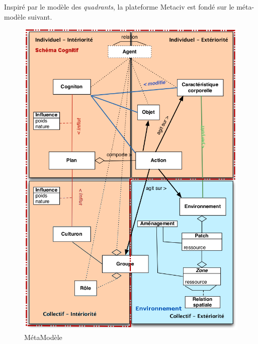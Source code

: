 \documentclass[a4paper,oneside,12 pt]{article}
\begin{document}
Inspiré par le modèle des \textit{quadrants}, la plateforme Metaciv est fondé sur le  méta-modèle suivant.
\begin{figure}[!h]
\begin{center}
\includegraphics[scale=0.6]{modele_update08_2015.png}
\caption[Modele]{MétaModèle \\}
\label{ex1}
\end{center}
\end{figure} 

\newpage
\end{document}
